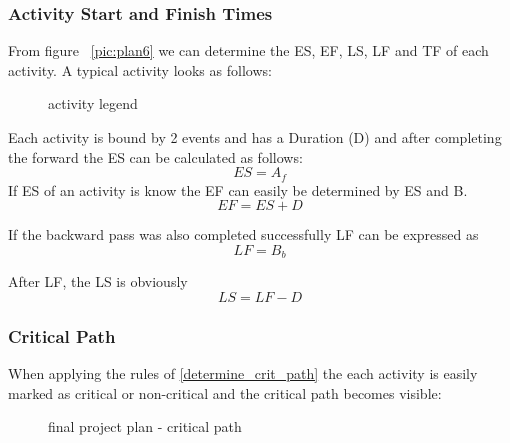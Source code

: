 \subsubsection{Activity Start and Finish Times}
From figure ~\ref{pic:plan6} we can determine the ES, EF, LS, LF and TF of each activity. A typical activity looks as follows:
\begin{figure}[h] 
\centerline{}
\label{pic:activity_plan}
\caption{activity legend}
\end{figure}
Each activity is bound by 2 events and has a Duration (D) and after completing the forward the ES can be calculated as follows:
\begin{equation}
ES = A_{f}
\end{equation}
If ES of an activity is know the EF can easily be determined by ES and B.
\begin{equation}
EF = ES + D
\end{equation}

If the backward pass was also completed successfully LF can be expressed as
\begin{equation}
LF = B_{b}
\end{equation}

After LF, the LS is obviously
\begin{equation}
LS = LF - D
\end{equation}

\subsubsection{Critical Path}

When applying the rules of \ref{determine_crit_path} the each activity is easily marked as critical or non-critical and the critical path becomes visible:
\begin{figure}[h] 
\centerline{}
\label{pic:plan7}
\caption{final project plan - critical path}
\end{figure}







